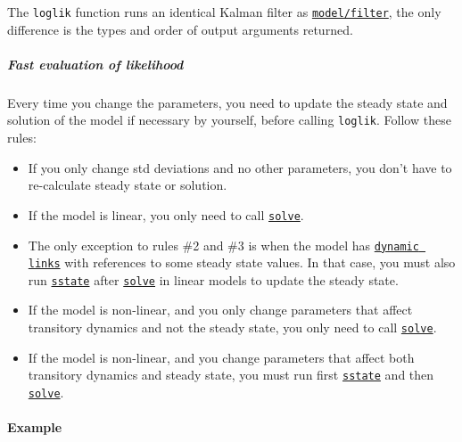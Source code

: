 The \texttt{loglik} function runs an identical Kalman filter as
\href{model/filter}{\texttt{model/filter}}, the only difference is the
types and order of output arguments returned.

\subparagraph{Fast evaluation of
likelihood}

Every time you change the parameters, you need to update the steady
state and solution of the model if necessary by yourself, before calling
\texttt{loglik}. Follow these rules:

\begin{itemize}
\item
  If you only change std deviations and no other parameters, you don't
  have to re-calculate steady state or solution.
\item
  If the model is linear, you only need to call
  \href{model/solve}{\texttt{solve}}.
\item
  The only exception to rules \#2 and \#3 is when the model has
  \href{modellang/links}{\texttt{dynamic links}} with references to some
  steady state values. In that case, you must also run
  \href{model/sstate}{\texttt{sstate}} after
  \href{model/solve}{\texttt{solve}} in linear models to update the
  steady state.
\item
  If the model is non-linear, and you only change parameters that affect
  transitory dynamics and not the steady state, you only need to call
  \href{model/solve}{\texttt{solve}}.
\item
  If the model is non-linear, and you change parameters that affect both
  transitory dynamics and steady state, you must run first
  \href{model/sstate}{\texttt{sstate}} and then
  \href{model/solve}{\texttt{solve}}.
\end{itemize}

\paragraph{Example}


